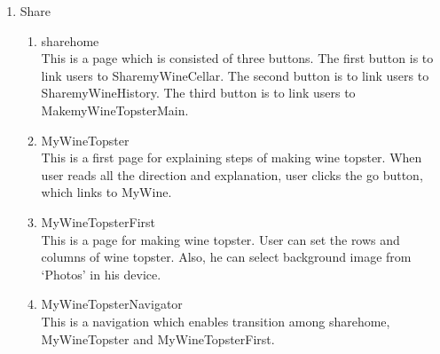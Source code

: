 \documentclass[conference]{IEEEtran}
\numberwithin{figure}{subsection}
\begin{document}
\begin{enumerate}
\begin{enumerate}
        \end{enumerate}
        \item Share
        \begin{enumerate}
            \item sharehome\\
            This is a page which is consisted of three buttons. The first button is to link users to SharemyWineCellar. The second button is to link users to SharemyWineHistory. The third button is to link users to MakemyWineTopsterMain. 
            \item MyWineTopster\\
            This is a first page for explaining steps of making wine topster. When user reads all the direction and explanation, user clicks the go button, which links to MyWine.
            \item MyWineTopsterFirst\\
            This is a page for making wine topster. User can set the rows and columns of wine topster. Also, he can select background image from ‘Photos’ in his device. 
            \item MyWineTopsterNavigator\\
            This is a navigation which enables transition among sharehome, MyWineTopster and MyWineTopsterFirst.
        \end{enumerate}
    \end{enumerate}
\end{document}
